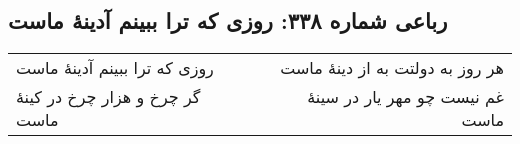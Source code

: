 \begin{center}
\section*{رباعی شماره ۳۳۸: روزی که ترا ببینم آدینهٔ ماست}
\label{sec:0338}
\begin{longtable}{l p{0.5cm} r}
روزی که ترا ببینم آدینهٔ ماست
&&
هر روز به دولتت به از دینهٔ ماست
\\
گر چرخ و هزار چرخ در کینهٔ ماست
&&
غم نیست چو مهر یار در سینهٔ ماست
\\
\end{longtable}
\end{center}
